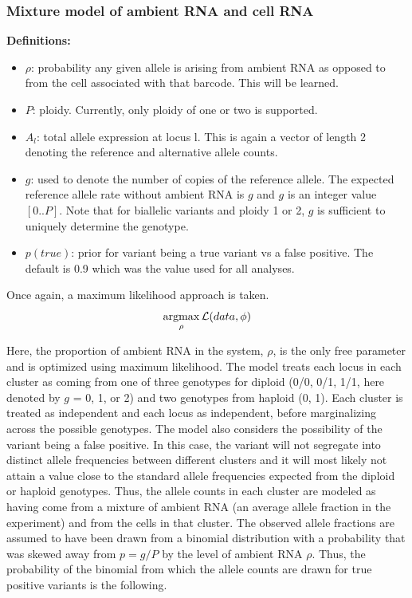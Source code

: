 \subsubsection{Mixture model of ambient RNA and cell RNA}
\textbf{Definitions:}
\begin{itemize}
\item $\rho$: probability any given allele is arising from ambient RNA as opposed to from the cell associated with that barcode. This will be learned.
\item $P$: ploidy. Currently, only ploidy of one or two is supported. 
\item $A_l$: total allele expression at locus l. This is again a vector of length 2 denoting the reference and alternative allele counts.
\item $g$: used to denote the number of copies of the reference allele. The expected reference allele rate without ambient RNA is $g$ and $g$ is an integer value $[0..P]$. Note that for biallelic variants and ploidy 1 or 2, $g$ is sufficient to uniquely determine the genotype. 
\item $p(true)$: prior for variant being a true variant vs a false positive. The default is 0.9 which was the value used for all analyses.
\end{itemize}


Once again, a maximum likelihood approach is taken.
\begin{equation}
\operatorname*{argmax}_{\rho} \mathcal{L}(data, \phi)
\end{equation}

\par{
Here, the proportion of ambient RNA in the system, $\rho$, is the only free parameter and is optimized using maximum likelihood. The model treats each locus in each cluster as coming from one of three genotypes for diploid (0/0, 0/1, 1/1, here denoted by $g$ = 0, 1, or 2) and two genotypes from haploid (0, 1). Each cluster is treated as independent and each locus as independent, before marginalizing across the possible genotypes. The model also considers the possibility of the variant being a false positive. In this case, the variant will not segregate into distinct allele frequencies between different clusters and it will most likely not attain a value close to the standard allele frequencies expected from the diploid or haploid genotypes. Thus, the allele counts in each cluster are modeled as having come from a mixture of ambient RNA (an average allele fraction in the experiment) and from the cells in that cluster. The observed allele fractions are assumed to have been drawn from a binomial distribution with a probability that was skewed away from $p = g/P$ by the level of ambient RNA $\rho$. Thus, the probability of the binomial from which the allele counts are drawn for true positive variants is the following.
}



